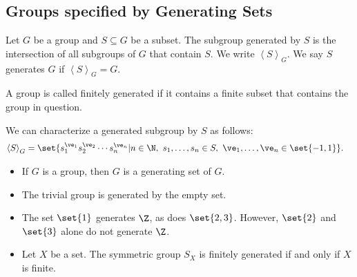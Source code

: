 \documentclass[10pt]{mypackage}
\begin{document}
\subsection{Groups specified by Generating Sets}%
\begin{definition}
  Let $G$ be a group and $S\subseteq G$ be a subset. The subgroup generated by $S$ is the intersection of all subgroups of $G$ that contain $S$. We write $\left\langle S \right\rangle_{G}$. We say $S$ generates $G$ if $\left\langle S \right\rangle_{G} = G$.\newline

  A group is called finitely generated if it contains a finite subset that contains the group in question.
\end{definition}
\begin{definition}
We can characterize a generated subgroup by $S$ as follows:
\begin{align*}
  \left\langle S \right\rangle_{G} &= \set{s_1^{\ve_1}s_{2}^{\ve_2}\cdots s_n^{\ve_n} | n\in\N,~s_1,\dots,s_n\in S,~\ve_1,\dots,\ve_n\in\set{-1,1}}.
\end{align*}
\end{definition}
\begin{example}\hfill
  \begin{itemize}
    \item If $G$ is a group, then $G$ is a generating set of $G$.
    \item The trivial group is generated by the empty set.
    \item The set $\set{1}$ generates $\Z$, as does $\set{2,3}$. However, $\set{2}$ and $\set{3}$ alone do not generate $\Z$.
    \item Let $X$ be a set. The symmetric group $S_{X}$ is finitely generated if and only if $X$ is finite.
  \end{itemize}
\end{example}
\end{document}

